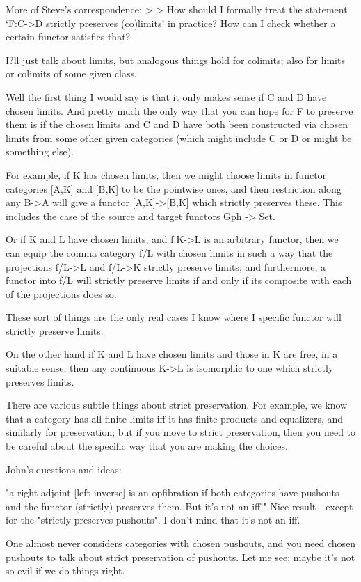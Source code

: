 \documentclass{amsart}
\begin{document}
{\chris More of Steve's correspondence:}
>
> How should I formally treat the statement `F:C->D strictly preserves (co)limits' in practice? How can I check whether a certain functor satisfies that?

I?ll just talk about limits, but analogous things hold for colimits; also for limits or colimits of some given class.

Well the first thing I would say is that it only makes sense if C and D have chosen limits.  And pretty much the only way that you can hope for F to preserve them is if the chosen limits and C
and D have both been constructed via chosen limits from some other given categories (which might include C or D or might be something else).

For example, if K has chosen limits, then we might choose limits in functor categories [A,K] and [B,K] to be the pointwise ones, and then restriction along any B->A will give a functor [A,K]->[B,K]
which strictly preserves these. This includes the case of the source and target functors Gph -> Set.

Or if K and L have chosen limits, and f:K->L is an arbitrary functor, then we can equip the comma category f/L with chosen limits in such a way that the projections f/L->L and f/L->K strictly preserve
limits; and furthermore, a functor into f/L will strictly preserve limits if and only if its composite with each of the projections does so.

These sort of things are the only real cases I know where I specific functor will strictly preserve limits. 

On the other hand if K and L have chosen limits and those in K are free, in a suitable sense, then any continuous K->L is isomorphic to one which strictly preserves limits. 

There are various subtle things about strict preservation. For example, we know that a category has all finite limits iff it has finite products and equalizers, and similarly for preservation; but if 
you move to strict preservation, then you need to be careful about the specific way that you are making the choices.

{\chris John's questions and ideas:}

"a right adjoint [left inverse] is an opfibration if both categories have pushouts and the functor (strictly) preserves them. But it's not an iff!"
Nice result - except for the "strictly preserves pushouts".   I don't mind that it's not an iff.

One almost never considers categories with chosen pushouts, and you need chosen pushouts to talk about strict preservation of pushouts.
Let me see; maybe it's not so evil if we do things right.
\end{document}
